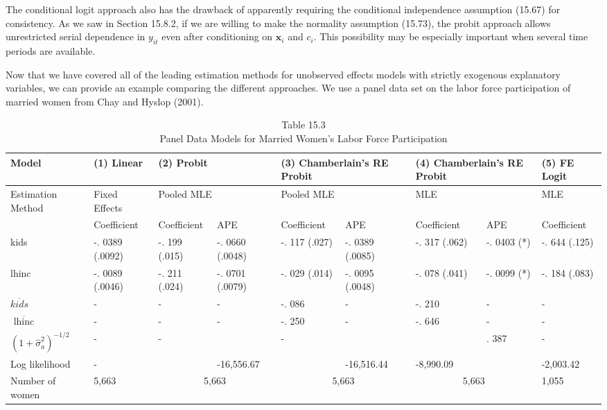 \documentclass[10pt]{article}
\begin{document}
The conditional logit approach also has the drawback of apparently requiring the conditional independence assumption (15.67) for consistency. As we saw in Section 15.8.2, if we are willing to make the normality assumption (15.73), the probit approach allows unrestricted serial dependence in $y_{i t}$ even after conditioning on $\mathbf{x}_{i}$ and $c_{i}$. This possibility may be especially important when several time periods are available.

Now that we have covered all of the leading estimation methods for unobserved effects models with strictly exogenous explanatory variables, we can provide an example comparing the different approaches. We use a panel data set on the labor force participation of married women from Chay and Hyslop (2001).

\begin{table}[h]
\begin{center}
\captionsetup{labelformat=empty}
\caption{Table 15.3\\
Panel Data Models for Married Women's Labor Force Participation}
\begin{tabular}{|l|l|l|l|l|l|l|l|l|}
\hline
Model & (1) Linear & \multicolumn{2}{|l|}{(2) Probit} & \multicolumn{2}{|l|}{(3) Chamberlain's RE Probit} & \multicolumn{2}{|l|}{(4) Chamberlain's RE Probit} & (5) FE Logit \\
\hline
\multirow[b]{2}{*}{Estimation Method} & Fixed Effects & \multicolumn{2}{|l|}{Pooled MLE} & \multicolumn{2}{|l|}{Pooled MLE} & \multicolumn{2}{|l|}{MLE} & MLE \\
\hline
 & Coefficient & Coefficient & APE & Coefficient & APE & Coefficient & APE & Coefficient \\
\hline
kids & -. 0389 (.0092) & -. 199 (.015) & -. 0660 (.0048) & -. 117 (.027) & -. 0389 (.0085) & -. 317 (.062) & -. 0403 (*) & -. 644 (.125) \\
\hline
lhinc & -. 0089 (.0046) & -. 211 (.024) & -. 0701 (.0079) & -. 029 (.014) & -. 0095 (.0048) & -. 078 (.041) & -. 0099 (*) & -. 184 (.083) \\
\hline
$\overline{k i d s}$ & - & - & - & -. 086 & - & -. 210 & - & - \\
\hline
$\overline{\text { lhinc }}$ & - & - & - & -. 250 & - & -. 646 & - & - \\
\hline
$\left(1+\hat{\sigma}_{a}^{2}\right)^{-1 / 2}$ & - & - &  & - &  &  & . 387 & - \\
\hline
Log likelihood & - &  & -16,556.67 &  & -16,516.44 & -8,990.09 &  & -2,003.42 \\
\hline
Number of women & 5,663 & \multicolumn{2}{|c|}{5,663} & \multicolumn{2}{|c|}{5,663} & \multicolumn{2}{|c|}{5,663} & 1,055 \\
\hline
\end{tabular}
\end{center}
\end{table}
\end{document}
